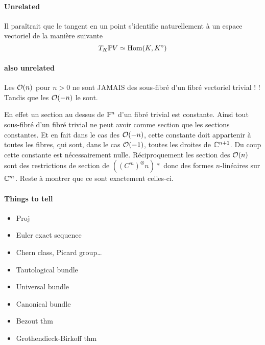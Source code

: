 \documentclass[a4paper,10pt,draft]{article}
\begin{document}
\paragraph*{Unrelated}
Il paraîtrait que le tangent en un point s'identifie naturellement à un espace vectoriel de la manière suivante
\[
T_K \mathbb{P} V \simeq \text{Hom}(K,K^\circ)
\]




\paragraph*{also unrelated} Les $\mathcal{O}(n)$ pour $n>0$ ne sont JAMAIS des sous-fibré d'un fibré vectoriel trivial ! ! Tandis que les $\mathcal{O}(-n)$ le sont.

En effet un section au dessus de $\mathbb{P}^n$ d'un fibré trivial est constante. Ainsi tout sous-fibré d'un fibré trivial ne peut avoir comme section que les sections constantes. Et en fait dans le cas des $\mathcal{O}(-n)$, cette constante doit appartenir à toutes les fibres, qui sont, dans le cas $\mathcal{O}(-1)$, toutes les droites de $\mathbb{C}^{n+1}$. Du coup cette constante est nécessairement nulle.
Réciproquement les section des $\mathcal{O}(n)$ sont des restrictions de section de $((C^m)^\otimes n)*$ donc des formes $n$-linéaires sur $\mathbb{C}^m$. Reste à montrer que ce sont exactement celles-ci.

\pagebreak

\paragraph{Things to tell}\todo{ }
\begin{itemize}
\item Proj
\item Euler exact sequence
\item Chern class, Picard group…
\item Tautological bundle
\item Universal bundle
\item Canonical bundle
\item Bezout thm
\item Grothendieck-Birkoff thm
\end{itemize}



%
%
\end{document}
